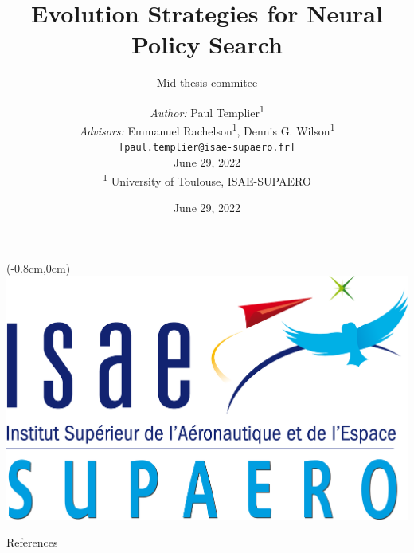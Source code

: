 \documentclass[usenames,dvipsnames,aspectratio=169]{beamer}
\title[Mid-thesis defense]{Evolution Strategies for Neural Policy Search}
\subtitle[]{Mid-thesis commitee}
\author{ 
	\textit{Author:} Paul Templier\textsuperscript{1} \\
	\textit{Advisors:} Emmanuel Rachelson\textsuperscript{1},
	Dennis G. Wilson\textsuperscript{1}\\
	\vspace{1em}
	\texttt{[paul.templier@isae-supaero.fr]}\\
	\vspace{1em}
	June 29, 2022\\
	\vspace{2em}
	\tiny \textsuperscript{1} University of Toulouse, ISAE-SUPAERO	
}
\date{June 29, 2022}
\begin{document}
	
	\begin{frame}{}%
		\begin{textblock*}{2cm}(-0.8cm,0cm) %
			\includegraphics[width=\textwidth]{images/misc/logo-isae-long.png}
		\end{textblock*}
		\vspace{2em}
		\titlepage
		\vspace{-6em}
	\end{frame}

	
	
	
	
	
	
	
	\setcounter{lastframe}{\insertframenumber}
	
	\begin{frame}[allowframebreaks]{References}
		
		
	\end{frame}

	
	
	\setcounter{framenumber}{\thelastframe}
\end{document}
